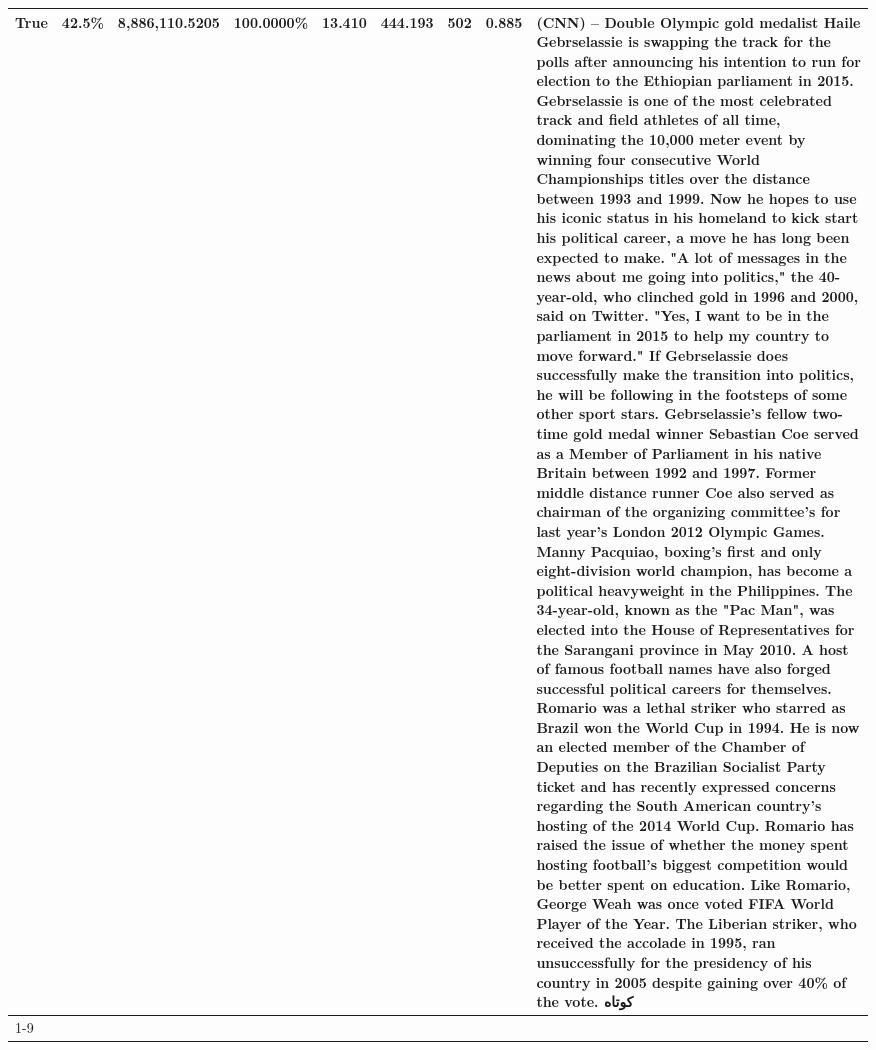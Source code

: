 \begin{table}[H]
{\begin{tabular}{lllrlllll}
True & 42.5\% & 8,886,110.5205 & \bfseries \color{red} 100.0000\% & 13.410 & 444.193 & 502 & 0.885 & (CNN) -- Double Olympic gold medalist Haile Gebrselassie is swapping the track for the polls after announcing his intention to run for election to the Ethiopian parliament in 2015. Gebrselassie is one of the most celebrated track and field athletes of all time, dominating the 10,000 meter event by winning four consecutive World Championships titles over the distance between 1993 and 1999. Now he hopes to use his iconic status in his homeland to kick start his political career, a move he has long been expected to make. "A lot of messages in the news about me going into politics," the 40-year-old, who clinched gold in 1996 and 2000, said on Twitter. "Yes, I want to be in the parliament in 2015 to help my country to move forward." If Gebrselassie does successfully make the transition into politics, he will be following in the footsteps of some other sport stars. Gebrselassie's fellow two-time gold medal winner Sebastian Coe served as a Member of Parliament in his native Britain between 1992 and 1997. Former middle distance runner Coe also served as chairman of the organizing committee's for last year's London 2012 Olympic Games. Manny Pacquiao, boxing's first and only eight-division world champion, has become a political heavyweight in the Philippines. The 34-year-old, known as the "Pac Man", was elected into the House of Representatives for the Sarangani province in May 2010. A host of famous football names have also forged successful political careers for themselves. Romario was a lethal striker who starred as Brazil won the World Cup in 1994. He is now an elected member of the Chamber of Deputies on the Brazilian Socialist Party ticket and has recently expressed concerns regarding the South American country's hosting of the 2014 World Cup. Romario has raised the issue of whether the money spent hosting football's biggest competition would be better spent on education. Like Romario, George Weah was once voted FIFA World Player of the Year. The Liberian striker, who received the accolade in 1995, ran unsuccessfully for the presidency of his country in 2005 despite gaining over 40\% of the vote. کوتاه \\
\cline{1-9}

\end{tabular}}
\end{table}
